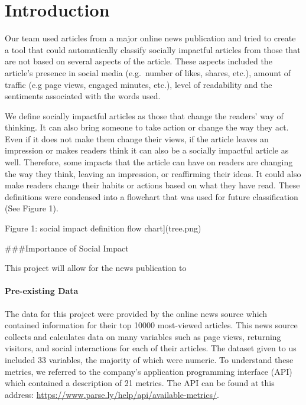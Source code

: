 \documentclass[10pt,letterpaper]{article}
\begin{document}
\linenumbers

\hypertarget{introduction}{%
\section{Introduction}\label{introduction}}

Our team used articles from a major online news publication and tried to
create a tool that could automatically classify socially impactful
articles from those that are not based on several aspects of the
article. These aspects included the article's presence in social media
(e.g.~number of likes, shares, etc.), amount of traffic (e.g page views,
engaged minutes, etc.), level of readability and the sentiments
associated with the words used.

We define socially impactful articles as those that change the readers'
way of thinking. It can also bring someone to take action or change the
way they act. Even if it does not make them change their views, if the
article leaves an impression or makes readers think it can also be a
socially impactful article as well. Therefore, some impacts that the
article can have on readers are changing the way they think, leaving an
impression, or reaffirming their ideas. It could also make readers
change their habits or actions based on what they have read. These
definitions were condensed into a flowchart that was used for future
classification (See Figure 1).

Figure 1: social impact definition flow chart{]}(tree.png)

\#\#\#Importance of Social Impact

This project will allow for the news publication to

\hypertarget{pre-existing-data}{%
\paragraph{Pre-existing Data}\label{pre-existing-data}}

The data for this project were provided by the online news source which
contained information for their top 10000 most-viewed articles. This
news source collects and calculates data on many variables such as page
views, returning visitors, and social interactions for each of their
articles. The dataset given to us included 33 variables, the majority of
which were numeric. To understand these metrics, we referred to the
company's application programming interface (API) which contained a
description of 21 metrics. The API can be found at this address:
\url{https://www.parse.ly/help/api/available-metrics/}.
\end{document}
